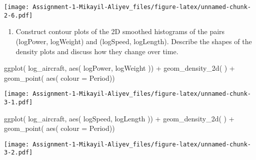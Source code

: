 \documentclass[
]{article}
\newenvironment{Shaded}{\begin{snugshade}}{\end{snugshade}}
\newcommand{\AttributeTok}[1]{\textcolor[rgb]{0.77,0.63,0.00}{#1}}
\newcommand{\FunctionTok}[1]{\textcolor[rgb]{0.00,0.00,0.00}{#1}}
\newcommand{\NormalTok}[1]{#1}
\newcommand{\SpecialCharTok}[1]{\textcolor[rgb]{0.00,0.00,0.00}{#1}}
\providecommand{\tightlist}{%
  \setlength{\itemsep}{0pt}\setlength{\parskip}{0pt}}
\begin{document}
\texttt{[image: Assignment-1-Mikayil-Aliyev\_files/figure-latex/unnamed-chunk-2-6.pdf]}

\begin{enumerate}
\def\labelenumi{\alph{enumi})}
\setcounter{enumi}{1}
\tightlist
\item
  Construct contour plots of the 2D smoothed histograms of the pairs
  (logPower, logWeight) and (logSpeed, logLength). Describe the shapes
  of the density plots and discuss how they change over time.
\end{enumerate}

\begin{Shaded}
\begin{Highlighting}[]
\FunctionTok{ggplot}\NormalTok{( log\_aircraft, }\FunctionTok{aes}\NormalTok{( logPower, logWeight )) }\SpecialCharTok{+} \FunctionTok{geom\_density\_2d}\NormalTok{( ) }\SpecialCharTok{+} \FunctionTok{geom\_point}\NormalTok{( }\FunctionTok{aes}\NormalTok{( }\AttributeTok{colour =}\NormalTok{ Period))}
\end{Highlighting}
\end{Shaded}

\texttt{[image: Assignment-1-Mikayil-Aliyev\_files/figure-latex/unnamed-chunk-3-1.pdf]}

\begin{Shaded}
\begin{Highlighting}[]
\FunctionTok{ggplot}\NormalTok{( log\_aircraft, }\FunctionTok{aes}\NormalTok{( logSpeed, logLength )) }\SpecialCharTok{+} \FunctionTok{geom\_density\_2d}\NormalTok{( ) }\SpecialCharTok{+} \FunctionTok{geom\_point}\NormalTok{( }\FunctionTok{aes}\NormalTok{( }\AttributeTok{colour =}\NormalTok{ Period))}
\end{Highlighting}
\end{Shaded}

\texttt{[image: Assignment-1-Mikayil-Aliyev\_files/figure-latex/unnamed-chunk-3-2.pdf]}
\end{document}
